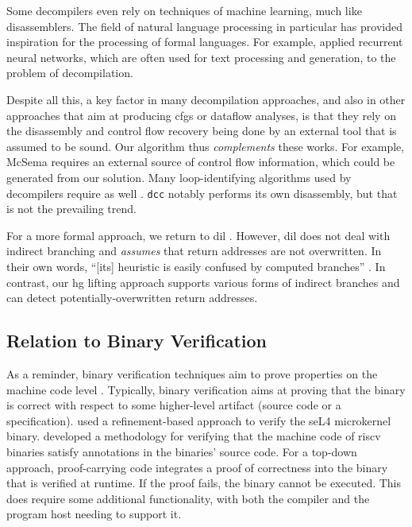 Some decompilers even rely on techniques of machine learning, much like disassemblers.
The field of natural language processing in particular has provided inspiration for the processing of formal languages.
For example, \textcite{katz2018recurrent} applied recurrent neural networks, which are often used for text processing and generation, to the problem of decompilation.

Despite all this, a key factor in many decompilation approaches, and also in other approaches that aim at producing \acp{cfg} or dataflow analyses, is that they rely on the disassembly and control flow recovery being done by an external tool that is assumed to be sound.
Our algorithm thus \emph{complements} these works.
For example, McSema requires an external source of control flow information, which could be generated from our solution.
Many loop-identifying algorithms used by decompilers require  as well \autocite{hecht1974reducible,wei2007loops}.
\lstinline|dcc| notably performs its own disassembly, but that is not the prevailing trend.

For a more formal approach, we return to \ac{dil} \autocite{myreen2007hoare,myreen2012dil}.
However, \ac{dil} does not deal with indirect branching and \emph{assumes} that return addresses are not overwritten.
In their own words, ``[its] heuristic is easily confused by computed branches'' \autocite{myreen2008dil}.
In contrast, our \ac{hg} lifting approach supports various forms of indirect branches and can detect potentially-overwritten return addresses.

\subsection{Relation to Binary Verification}\label{related-hg-verification}
As a reminder, binary verification techniques aim to prove properties on the machine code level \autocite{kumar2018software}.
Typically, binary verification aims at proving that the binary is correct with respect to some higher-level artifact (source code or a specification).
\Textcite{klein2009sel4,klein2010refinement,sewell2013tvv} used a refinement-based approach to verify the seL4 microkernel binary.
\Textcite{kamkin2020deductive} developed a methodology for verifying that the machine code of \gls{riscv} binaries satisfy annotations in the binaries' source code.
For a top-down approach, proof-carrying code \autocite{necula1997proof}
integrates a proof of correctness into the binary that is verified at runtime.
If the proof fails, the binary cannot be executed.
This does require some additional functionality, with both the compiler and the program host needing to support it.

